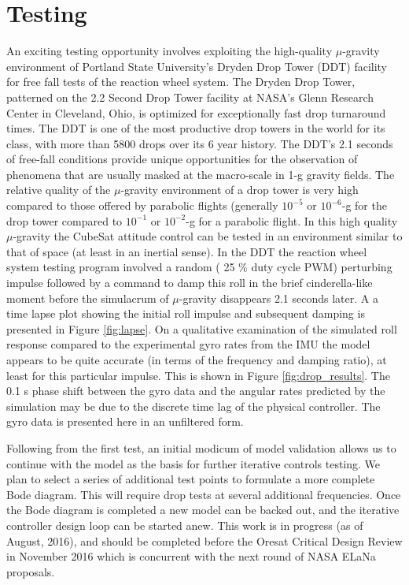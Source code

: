 \documentclass[]{aiaa-tc}%
\begin{document}
\section{Testing}
An exciting testing opportunity involves exploiting the high-quality $\mu$-gravity environment of Portland State University's Dryden Drop Tower (DDT) facility for free fall tests of the reaction wheel system. The Dryden Drop Tower, patterned on the 2.2 Second Drop Tower facility at NASA's Glenn Research Center in Cleveland, Ohio, is optimized for exceptionally fast drop turnaround times. The DDT is one of the most productive drop towers in the world for its class, with more than 5800 drops over its 6 year history. The DDT's 2.1 seconds of free-fall conditions provide unique opportunities for the observation of phenomena that are usually masked at the macro-scale in 1-g gravity fields. The relative quality of the $\mu$-gravity environment of a drop tower is very high compared to those offered by parabolic flights (generally $10^{-5}$ or $10^{-6}$-g for the drop tower compared to $10^{-1}$ or $10^{-2}$-g for a parabolic flight. In this high quality $\mu$-gravity the CubeSat attitude control can be tested in an environment similar to that of space (at least in an inertial sense). In the DDT the reaction wheel system testing program involved a random ( 25 \% duty cycle PWM) perturbing impulse followed by a command to damp this roll in the brief cinderella-like moment before the simulacrum of $\mu$-gravity disappears 2.1 seconds later. A a time lapse plot showing the initial roll impulse and subsequent damping is presented in Figure \ref{fig:lapse}. On a qualitative examination of the simulated roll response compared to the experimental gyro rates from the IMU the model appears to be quite accurate (in terms of the frequency and damping ratio), at least for this particular impulse. This is shown in Figure \ref{fig:drop_results}. The 0.1 s phase shift between the gyro data and the angular rates predicted by the simulation may be due to the discrete time lag of the physical controller. The gyro data is presented here in an unfiltered form. 

Following from the first test, an initial modicum of model validation allows us to continue with the model as the basis for further iterative controls testing. We plan to select a series of additional test points to formulate a more complete Bode diagram. This will require drop tests at several additional frequencies. Once the Bode diagram is completed a new model can be backed out, and the iterative controller design loop can be started anew. This work is in progress (as of August, 2016), and should be completed before the Oresat Critical Design Review in November 2016 which is concurrent with the next round of NASA ELaNa proposals.
\end{document}
